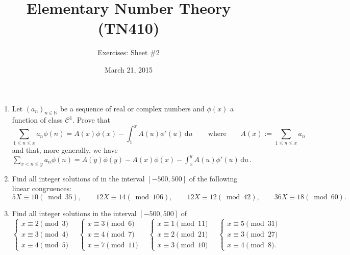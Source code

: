 \documentclass[a4paper,12pt]{article}
\title{Elementary Number Theory (TN410)}
\author{Exercises: Sheet \#2}
\date{March 21, 2015}
\begin{document}
\maketitle



\begin{enumerate}
 \item Let $(a_n)_{n\in\mathbb N}$ be a sequence of real or complex numbers and $\phi (x)$ a function of class $\mathcal{C}^1$. Prove that
$$\sum_{1 \le n \le x} a_n \phi(n) = A(x)\phi(x) - \int_1^x A(u)\phi'(u) \, \mathrm{d}u \,\qquad\text{where}\qquad
A(x):= \sum_{1 \le n \le x} a_n \,$$ and that, more generally, we have
$\displaystyle\sum_{x< n\le y} a_n\phi(n) = A(y)\phi(y) - A(x)\phi(x) -\int_x^y A(u)\phi'(u)\,\mathrm{d}u \,.$
 \item Find all integer solutions of  in the interval $[-500,500]$ of the following linear congruences:
$$5X\equiv 10(\bmod 35),\qquad 12X\equiv 14(\bmod 106),\qquad 12X\equiv 12(\bmod 42),\qquad 36X\equiv 18(\bmod 60).$$
 \item Find all integer solutions in the interval $[-500,500]$ of
$$\begin{cases} x \equiv 2  \pmod{3} \\ x \equiv 3  \pmod{4} \\ x \equiv 4  \pmod{5} \end{cases}\quad 
\begin{cases} x \equiv 3  \pmod{6} \\ x \equiv 4  \pmod{7} \\ x \equiv 7  \pmod{11} \end{cases}\quad
\begin{cases} x \equiv 1  \pmod{11} \\ x \equiv 2  \pmod{21} \\ x \equiv 3  \pmod{10} \end{cases}\quad
\begin{cases} x \equiv 5  \pmod{31} \\ x \equiv 3  \pmod{27} \\ x \equiv 4  \pmod{8}. \end{cases}$$

\end{enumerate}
\end{document}
